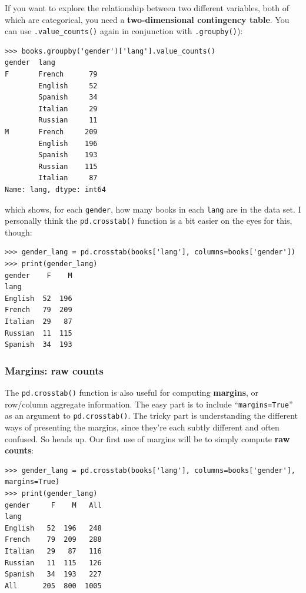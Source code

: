 If you want to explore the relationship between two different variables, both
of which are categorical, you need a \textbf{two-dimensional contingency
table}. You can use \texttt{.value\_counts()} again in conjunction with
\texttt{.groupby()}):

\begin{Verbatim}[fontsize=\scriptsize,samepage=true,frame=single]
>>> books.groupby('gender')['lang'].value_counts()
gender  lang   
F       French      79
        English     52
        Spanish     34
        Italian     29
        Russian     11
M       French     209
        English    196
        Spanish    193
        Russian    115
        Italian     87
Name: lang, dtype: int64
\end{Verbatim}

which shows, for each \texttt{gender}, how many books in each \texttt{lang} are
in the data set. I personally think the \texttt{pd.crosstab()} function is a
bit easier on the eyes for this, though:

\begin{Verbatim}[fontsize=\scriptsize,samepage=true,frame=single]
>>> gender_lang = pd.crosstab(books['lang'], columns=books['gender'])
>>> print(gender_lang)
gender    F    M
lang            
English  52  196
French   79  209
Italian  29   87
Russian  11  115
Spanish  34  193
\end{Verbatim}

\subsubsection{Margins: raw counts}
\label{marginsBegin}

The \texttt{pd.crosstab()} function is also useful for computing
\textbf{margins}, or row/column aggregate information. The easy part is to
include ``\texttt{margins=True}'' as an argument to \texttt{pd.crosstab()}. The
tricky part is understanding the different ways of presenting the margins,
since they're each subtly different and often confused. So heads up. Our first
use of margins will be to simply compute \textbf{raw counts}:

\begin{Verbatim}[fontsize=\scriptsize,samepage=true,frame=single]
>>> gender_lang = pd.crosstab(books['lang'], columns=books['gender'], margins=True)
>>> print(gender_lang)
gender     F    M   All
lang                   
English   52  196   248
French    79  209   288
Italian   29   87   116
Russian   11  115   126
Spanish   34  193   227
All      205  800  1005
\end{Verbatim}

